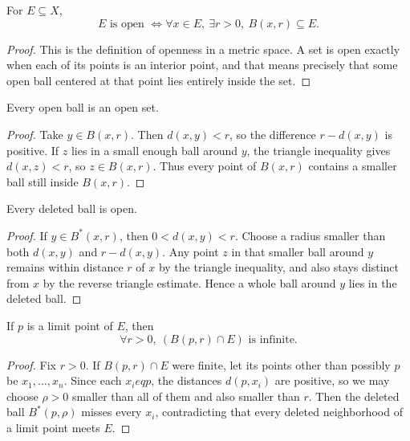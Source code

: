 \begin{theorem}
\label{thm:open-iff-ball-subset}
For $E \subseteq X$,
\[
E \text{ is open } \iff \forall x \in E,\ \exists r>0,\ B(x,r)\subseteq E.
\]
\begin{proof}
This is the definition of openness in a metric space. A set is open exactly when each of its
points is an interior point, and that means precisely that some open ball centered at that
point lies entirely inside the set.
\end{proof}
\end{theorem}

\begin{theorem}
\label{thm:open-ball-open}
Every open ball is an open set.
\begin{proof}
Take $y\in B(x,r)$. Then $d(x,y)<r$, so the difference $r-d(x,y)$ is positive. If $z$ lies in a
small enough ball around $y$, the triangle inequality gives $d(x,z)<r$, so $z\in B(x,r)$. Thus
every point of $B(x,r)$ contains a smaller ball still inside $B(x,r)$.
\end{proof}
\end{theorem}

\begin{theorem}
\label{thm:deleted-ball-open}
Every deleted ball is open.
\begin{proof}
If $y\in B^\ast(x,r)$, then $0<d(x,y)<r$. Choose a radius smaller than both $d(x,y)$ and
$r-d(x,y)$. Any point $z$ in that smaller ball around $y$ remains within distance $r$ of $x$ by
the triangle inequality, and also stays distinct from $x$ by the reverse triangle estimate.
Hence a whole ball around $y$ lies in the deleted ball.
\end{proof}
\end{theorem}

\begin{theorem}
\label{thm:limit-point-infinite-neighborhood}
If $p$ is a limit point of $E$, then
\[
\forall r>0,\ (B(p,r)\cap E)\text{ is infinite}.
\]
\begin{proof}
Fix $r>0$. If $B(p,r)\cap E$ were finite, let its points other than possibly $p$ be
$x_1,\dots,x_n$. Since each $x_i
eq p$, the distances $d(p,x_i)$ are positive, so we may choose
$\rho>0$ smaller than all of them and also smaller than $r$. Then the deleted ball
$B^\ast(p,\rho)$ misses every $x_i$, contradicting that every deleted neighborhood of a limit
point meets $E$.
\end{proof}
\end{theorem}

